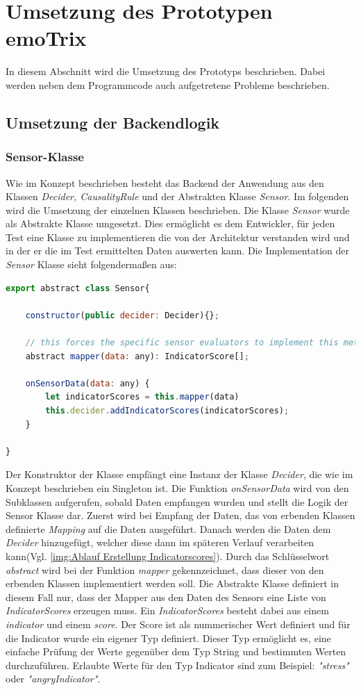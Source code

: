\section{Umsetzung des Prototypen emoTrix}
In diesem Abschnitt wird die Umsetzung des Prototyps beschrieben. Dabei werden neben dem Programmcode auch aufgetretene Probleme beschrieben.
\subsection{Umsetzung der Backendlogik}
\subsubsection{Sensor-Klasse}
Wie im Konzept beschrieben besteht das Backend der Anwendung aus den Klassen \textit{Decider, CausalityRule} und der Abstrakten Klasse \textit{Sensor}. Im folgenden wird die Umsetzung der einzelnen Klassen beschrieben.\newline
Die Klasse \textit{Sensor} wurde als Abstrakte Klasse umgesetzt. Dies ermöglicht es dem Entwickler, für jeden Test eine Klasse zu implementieren die von der Architektur verstanden wird und in der er die im Test ermittelten Daten auswerten kann. Die Implementation der \textit{Sensor} Klasse sieht folgendermaßen aus: \newline
\begin{lstlisting}[caption={abstrakte Klasse Sensor},language=JavaScript]
export abstract class Sensor{

	constructor(public decider: Decider){};

	// this forces the specific sensor evaluators to implement this method
	abstract mapper(data: any): IndicatorScore[]; 

	onSensorData(data: any) {
		let indicatorScores = this.mapper(data)
		this.decider.addIndicatorScores(indicatorScores);
	}

}
\end{lstlisting}
Der Konstruktor der Klasse empfängt eine Instanz der Klasse \textit{Decider}, die wie im Konzept beschrieben ein Singleton ist. Die Funktion \textit{onSensorData} wird von den Subklassen aufgerufen, sobald Daten empfangen wurden und stellt die Logik der Sensor Klasse dar. Zuerst wird bei Empfang der Daten, das von erbenden Klassen definierte \textit{Mapping} auf die Daten ausgeführt. Danach werden die Daten dem \textit{Decider} hinzugefügt, welcher diese dann im späteren Verlauf verarbeiten kann(Vgl. \ref{img:Ablauf Erstellung Indicatorscores}). Durch das Schlüsselwort \textit{abstract} wird bei der Funktion \textit{mapper} gekennzeichnet, dass dieser von den erbenden Klassen implementiert werden soll. Die Abstrakte Klasse definiert in diesem Fall nur, dass der Mapper aus den Daten des Sensors eine Liste von \textit{IndicatorScores} erzeugen muss. Ein \textit{IndicatorScores} besteht dabei aus einem \textit{indicator} und einem \textit{score}. Der Score ist als nummerischer Wert definiert und für die Indicator wurde ein eigener Typ definiert. Dieser Typ ermöglicht es, eine einfache Prüfung der Werte gegenüber dem Typ String und bestimmten Werten durchzuführen. Erlaubte Werte für den Typ Indicator sind zum Beispiel: \textit{"stress"} oder \textit{"angryIndicator"}.\newline
